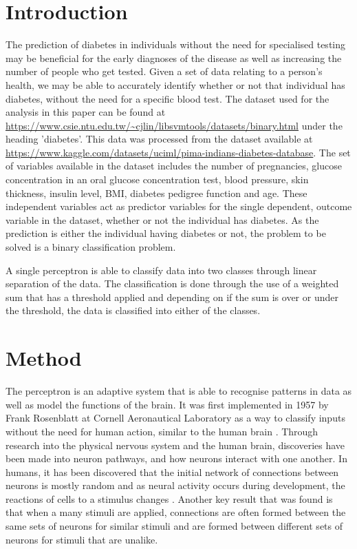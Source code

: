 \documentclass[10pt,twocolumn,a4paper]{article}
\begin{document}
\section{Introduction}

The prediction of diabetes in individuals without the need for specialised
testing may be beneficial for the early diagnoses of the disease as well
as increasing the number of people who get tested. Given a set of data
relating to a person's health, we may be able to accurately identify
whether or not that individual has diabetes, without the need for a
specific blood test. The dataset used for the analysis in this paper can be found at \url{https://www.csie.ntu.edu.tw/~cjlin/libsvmtools/datasets/binary.html} under the heading 'diabetes'. This data was processed from the dataset available at  \url{https://www.kaggle.com/datasets/uciml/pima-indians-diabetes-database}. The set of variables available in the dataset includes
the number of pregnancies, glucose concentration in an oral glucose
concentration test, blood pressure, skin thickness, insulin level, BMI,
diabetes pedigree function and age. These independent variables act as
predictor variables for the single dependent, outcome variable in the
dataset, whether or not the individual has diabetes. As the prediction
is either the individual having diabetes or not, the problem to be solved
is a binary classification problem.

A single perceptron is able to classify data into two classes through linear
separation of the data. The classification is done through the use of a
weighted sum that has a threshold applied and depending on if the sum is
over or under the threshold, the data is classified into either of the classes.

\section{Method}

The perceptron is an adaptive system that is able to recognise patterns in data as well as model the functions of the brain. It was first implemented in 1957 by Frank Rosenblatt at Cornell Aeronautical Laboratory as a way to classify inputs without the need for human action, similar to the human brain \cite{frosenblatt:1958}. Through research into the physical nervous system and the human brain, discoveries have been made into neuron pathways, and how neurons interact with one another. In humans, it has been discovered that the initial network of connections between neurons is mostly random and as neural activity occurs during development, the reactions of cells to a stimulus changes \cite{block:1962}. Another key result that was found is that when a many stimuli are applied, connections are often formed between the same sets of neurons for similar stimuli and are formed between different sets of neurons for stimuli that are unalike. \cite{}
\end{document}
